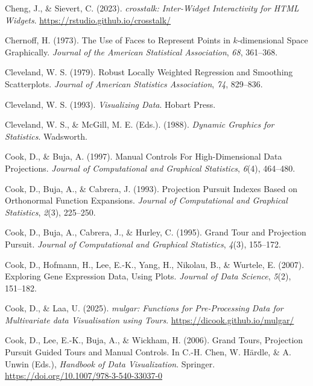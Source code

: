 \documentclass[
  letterpaper,
]{krantz}
\newlength{\cslhangindent}
\newenvironment{CSLReferences}[2] %
 {\begin{list}{}{%
  \setlength{\itemindent}{0pt}
  \setlength{\leftmargin}{0pt}
  \setlength{\parsep}{0pt}
  \ifodd #1
   \setlength{\leftmargin}{\cslhangindent}
   \setlength{\itemindent}{-1\cslhangindent}
  \fi
  \setlength{\itemsep}{#2\baselineskip}}}
 {\end{list}}
\begin{document}
\begin{CSLReferences}{1}{0}
Cheng, J., \& Sievert, C. (2023). \emph{{crosstalk}: {I}nter-{W}idget
{I}nteractivity for {HTML} {W}idgets}.
\url{https://rstudio.github.io/crosstalk/}

Chernoff, H. (1973). The {U}se of {F}aces to {R}epresent {P}oints in
\(k\)-dimensional {S}pace {G}raphically. \emph{Journal of the American
Statistical Association}, \emph{68}, 361--368.

Cleveland, W. S. (1979). Robust {L}ocally {W}eighted {R}egression and
{S}moothing {S}catterplots. \emph{Journal of American Statistics
Association}, \emph{74}, 829--836.

Cleveland, W. S. (1993). \emph{Visualizing {D}ata}. Hobart Press.

Cleveland, W. S., \& McGill, M. E. (Eds.). (1988). \emph{Dynamic
{G}raphics for {S}tatistics}. Wadsworth.

Cook, D., \& Buja, A. (1997). {M}anual {C}ontrols {F}or
{H}igh-{D}imensional {D}ata {P}rojections. \emph{Journal of
Computational and Graphical Statistics}, \emph{6}(4), 464--480.

Cook, D., Buja, A., \& Cabrera, J. (1993). {P}rojection {P}ursuit
{I}ndexes {B}ased on {O}rthonormal {F}unction {E}xpansions.
\emph{Journal of Computational and Graphical Statistics}, \emph{2}(3),
225--250.

Cook, D., Buja, A., Cabrera, J., \& Hurley, C. (1995). Grand {T}our and
{P}rojection {P}ursuit. \emph{Journal of Computational and Graphical
Statistics}, \emph{4}(3), 155--172.

Cook, D., Hofmann, H., Lee, E.-K., Yang, H., Nikolau, B., \& Wurtele, E.
(2007). Exploring {G}ene {E}xpression {D}ata, {U}sing {P}lots.
\emph{Journal of Data Science}, \emph{5}(2), 151--182.

Cook, D., \& Laa, U. (2025). \emph{{mulgar}: {F}unctions for
{P}re-{P}rocessing {D}ata for {M}ultivariate data {V}isualisation using
{T}ours}. \url{https://dicook.github.io/mulgar/}

Cook, D., Lee, E.-K., Buja, A., \& Wickham, H. (2006). {G}rand {T}ours,
{P}rojection {P}ursuit {G}uided {T}ours and {M}anual {C}ontrols. In
C.-H. Chen, W. Härdle, \& A. Unwin (Eds.), \emph{Handbook of {D}ata
{V}isualization}. Springer.
\url{https://doi.org/10.1007/978-3-540-33037-0}


\end{CSLReferences}
\end{document}
